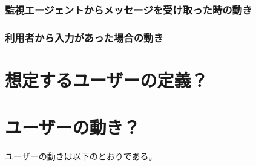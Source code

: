 \subsubsection{監視エージェントからメッセージを受け取った時の動き}

\subsubsection{利用者から入力があった場合の動き}


\section{想定するユーザーの定義？}

\section{ユーザーの動き？}
ユーザーの動きは以下のとおりである。









